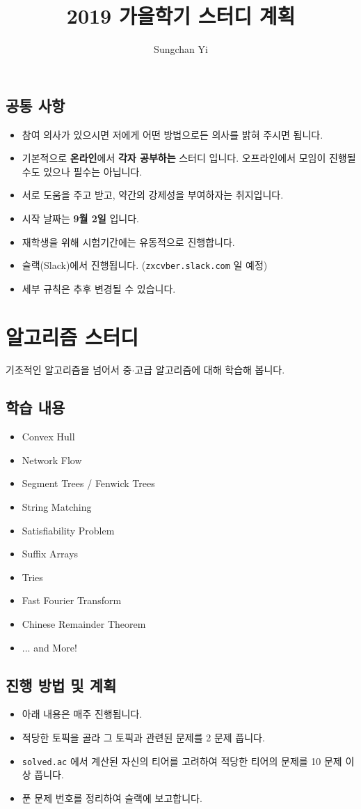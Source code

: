 \documentclass[12pt]{article}
\title{\textbf{2019 가을학기 스터디 계획}}
\author{Sungchan Yi}
\begin{document}
\maketitle

\tableofcontents
\subsection{공통 사항}
\begin{itemize}
	\item 참여 의사가 있으시면 저에게 어떤 방법으로든 의사를 밝혀 주시면 됩니다.
	\item 기본적으로 \textbf{온라인}에서 \textbf{각자 공부하는} 스터디 입니다. 오프라인에서 모임이 진행될 수도 있으나 필수는 아닙니다.
	\item 서로 도움을 주고 받고, 약간의 강제성을 부여하자는 취지입니다.
	\item 시작 날짜는 \textbf{9월 2일} 입니다.
	\item 재학생을 위해 시험기간에는 유동적으로 진행합니다.
	\item 슬랙(Slack)에서 진행됩니다. (\texttt{zxcvber.slack.com} 일 예정)
	\item 세부 규칙은 추후 변경될 수 있습니다.
	
\end{itemize}
\pagebreak
\section{알고리즘 스터디}
기초적인 알고리즘을 넘어서 중$\cdot$고급 알고리즘에 대해 학습해 봅니다.
\subsection{학습 내용}
\begin{itemize}
	\item Convex Hull
	\item Network Flow
	\item Segment Trees / Fenwick Trees
	\item String Matching
	\item Satisfiability Problem
	\item Suffix Arrays
	\item Tries
	\item Fast Fourier Transform
	\item Chinese Remainder Theorem
	\item ... and More!
\end{itemize}
\subsection{진행 방법 및 계획}
\begin{itemize}
	\item 아래 내용은 매주 진행됩니다.
	\item 적당한 토픽을 골라 그 토픽과 관련된 문제를 2 문제 풉니다.
	\item \texttt{solved.ac} 에서 계산된 자신의 티어를 고려하여 적당한 티어의 문제를 10 문제 이상 풉니다.
	\item 푼 문제 번호를 정리하여 슬랙에 보고합니다.
\end{itemize}
\pagebreak
\end{document}
